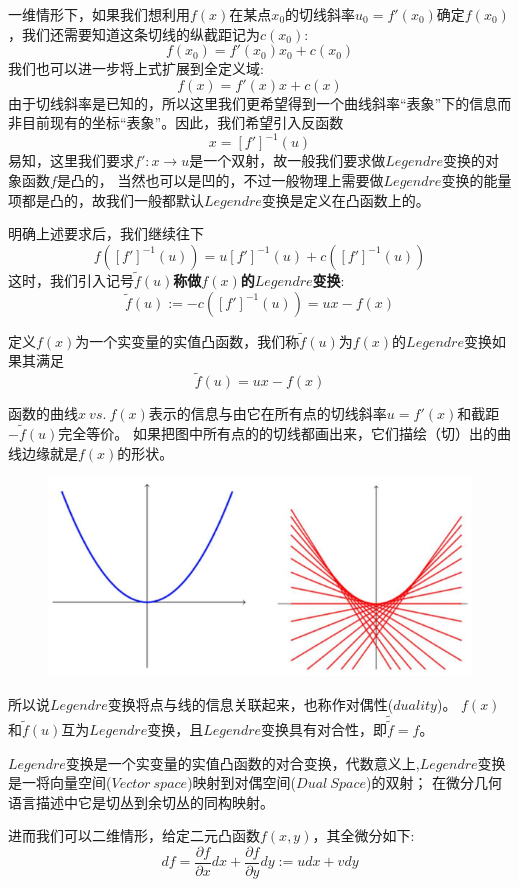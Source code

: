 一维情形下，如果我们想利用$f(x)$在某点$x_0$的切线斜率$u_0=f'(x_0)$确定$f(x_0)$，我们还需要知道这条切线的纵截距记为$c(x_0)$:
\[f(x_0)=f'(x_0)x_0+c(x_0)\]
我们也可以进一步将上式扩展到全定义域:
\[f(x)=f'(x)x+c(x)\]
由于切线斜率是已知的，所以这里我们更希望得到一个曲线斜率“表象”下的信息而非目前现有的坐标“表象”。因此，我们希望引入反函数
\[x=[f']^{-1}(u)\]
易知，这里我们要求$f':x \rightarrow u$是一个双射，故一般我们要求做$Legendre$变换的对象函数$f$是凸的，
当然也可以是凹的，不过一般物理上需要做$Legendre$变换的能量项都是凸的，故我们一般都默认$Legendre$变换是定义在凸函数上的。

明确上述要求后，我们继续往下
\[f([f']^{-1}(u))=u[f']^{-1}(u)+c([f']^{-1}(u))\]
这时，我们引入记号$\tilde{f}(u)$\textbf{称做$f(x)$的$Legendre$变换}:
\[\tilde{f}(u):=-c([f']^{-1}(u))=ux-f(x)\]

\begin{definition}[一维$Legendre$变换]
    定义$f(x)$为一个实变量的实值凸函数，我们称$\tilde{f}(u)$为$f(x)$的$Legendre$变换如果其满足
    \[\tilde{f}(u)=ux-f(x)\]
\end{definition}

函数的曲线$x \ vs. \ f(x)$表示的信息与由它在所有点的切线斜率$u=f'(x)$和截距$-\tilde{f}(u)$完全等价。
如果把图中所有点的的切线都画出来，它们描绘（切）出的曲线边缘就是$f(x)$的形状。
\begin{figure}[htbp]
    \centering
    \includegraphics[scale=0.8]{./fig/Legendre Transform/2.png}
\end{figure}
所以说$Legendre$变换将点与线的信息关联起来，也称作对偶性($duality$)。
$f(x)$和$\tilde{f}(u)$互为$Legendre$变换，且$Legendre$变换具有对合性，即$\tilde{\tilde{f}}=f$。

$Legendre$变换是一个实变量的实值凸函数的对合变换，代数意义上,$Legendre$变换是一将向量空间($Vector \ space$)映射到对偶空间($Dual \ Space$)的双射；
在微分几何语言描述中它是切丛到余切丛的同构映射。

进而我们可以二维情形，给定二元凸函数$f(x,y)$，其全微分如下:
\[df=\frac{\partial f}{\partial x}dx+\frac{\partial f}{\partial y}dy:=udx+vdy\]

